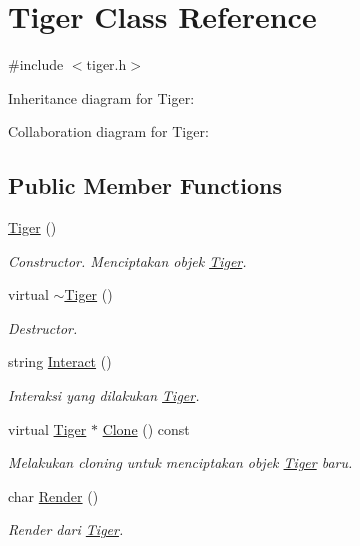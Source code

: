 \hypertarget{classTiger}{}\section{Tiger Class Reference}
\label{classTiger}


{\ttfamily \#include $<$tiger.\+h$>$}



Inheritance diagram for Tiger\+:


Collaboration diagram for Tiger\+:
\subsection*{Public Member Functions}
\begin{DoxyCompactItemize}
\item 
\hyperlink{classTiger_ab2b455a0cdbd21f2052eef2a176f0eeb}{Tiger} ()
\begin{DoxyCompactList}\small\item\em Constructor. Menciptakan objek \hyperlink{classTiger}{Tiger}. \end{DoxyCompactList}\item 
virtual \hyperlink{classTiger_ae9a0109993b438dd7405b4018ba62d4b}{$\sim$\+Tiger} ()
\begin{DoxyCompactList}\small\item\em Destructor. \end{DoxyCompactList}\item 
string \hyperlink{classTiger_ae318cc373300a52e13598f42368a2c70}{Interact} ()
\begin{DoxyCompactList}\small\item\em Interaksi yang dilakukan \hyperlink{classTiger}{Tiger}. \end{DoxyCompactList}\item 
virtual \hyperlink{classTiger}{Tiger} $\ast$ \hyperlink{classTiger_aa376d57a4b2d56edb586f7ba1b170037}{Clone} () const 
\begin{DoxyCompactList}\small\item\em Melakukan cloning untuk menciptakan objek \hyperlink{classTiger}{Tiger} baru. \end{DoxyCompactList}\item 
char \hyperlink{classTiger_a42b09a0bfc8c115e7383e926513fb371}{Render} ()
\begin{DoxyCompactList}\small\item\em Render dari \hyperlink{classTiger}{Tiger}. \end{DoxyCompactList}\end{DoxyCompactItemize}
